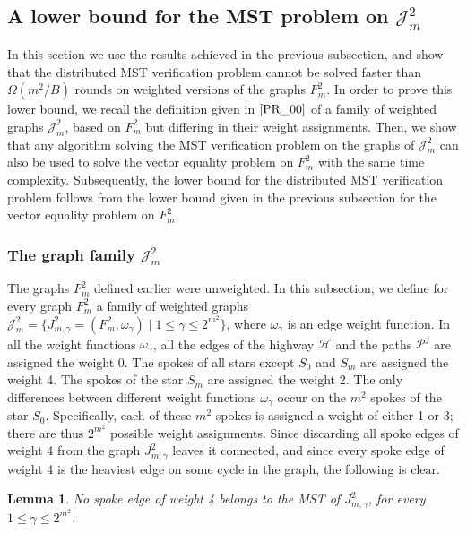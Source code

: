 \documentclass[11pt,letter]{article}
\def\cP{\mathcal{P}}
\def\cH{\mathcal{H}}
\def\cJ{\mathcal{J}}
\newtheorem{lemma}[theorem]{Lemma}
\begin{document}
\subsection {A lower bound for the MST problem on $\cJ^2_m$}
\label{sec:lb_ver_prob}

In this section we use the results achieved in the previous subsection,
and show that 
the distributed MST verification
problem cannot be solved faster than $\Omega(m^2/B)$ rounds on weighted
versions of the graphs $F^2_m$.
In order to prove this lower bound, 
we recall the definition given in $\cite{PR_00}$ 
of a family of weighted graphs $\cJ^2_m$, based on $F_m^2$ but differing 
in their weight assignments.
Then, 
we show that any algorithm solving 
the MST verification problem on the graphs of $\cJ^2_m$ can also be used to 
solve the vector equality problem on $F^2_m$ with the same time complexity.
Subsequently, the lower bound for the distributed MST verification problem 
follows from 
the lower bound given in the previous subsection for the vector 
equality problem on $F^2_m$.

\subsubsection{The graph family $\cJ^2_m$}
The graphs $F^2_m$ defined earlier were unweighted.
In this subsection, we define for every graph $F^2_m$ a family of
weighted graphs
$\cJ^2_m = \{ J^2_{m,\gamma} = (F_m^2, \omega_\gamma) \mid
1 \le \gamma \le 2^{m^2}\}$,
where $\omega_\gamma$ is an edge weight function.
In all the weight functions $\omega_\gamma$, all the edges of the
highway $\cH$ and the paths $\cP^j$ are assigned the weight $0$.
The spokes of all stars except $S_0$ and $S_m$ are assigned
the weight 4. The spokes of the star $S_m$ are assigned the weight 2.
The only differences between different weight functions $\omega_\gamma$
occur on the $m^2$ spokes of the star $S_0$.
Specifically, each of these $m^2$ spokes is assigned a weight of
either 1 or 3; there are thus $2^{m^2}$ possible 
weight assignments. 
\newline\indent
Since discarding all spoke edges of weight 4 from the
graph $J^2_{m,\gamma}$ leaves it connected, and since every spoke
edge of weight 4 is the heaviest edge on some cycle in the graph, the
following is clear.

\begin{lemma}
\label{infWE}
No spoke edge of weight 4 belongs to the MST of $J^2_{m,\gamma}$,
for every $1\le\gamma \le 2^{m^2}$.
\end{lemma}
\end{document}
